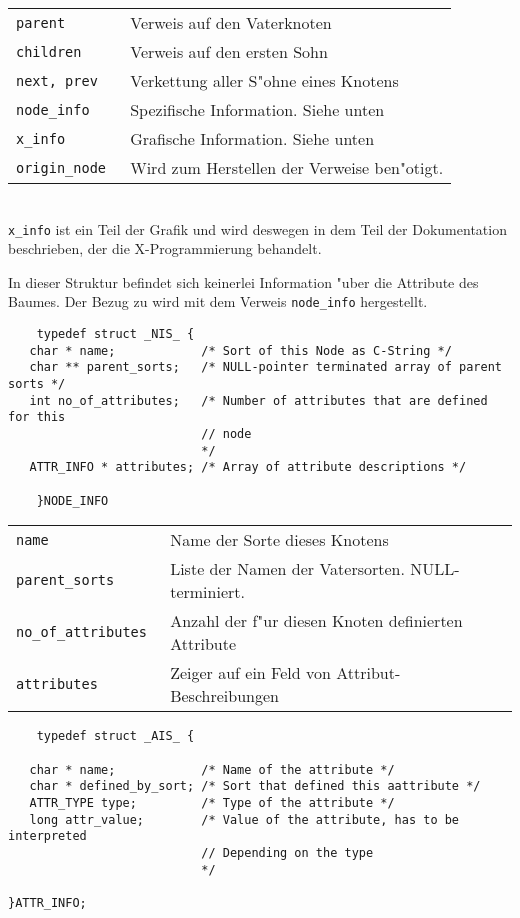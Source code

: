 	\begin{tabular}{ll}
	\tt parent & Verweis auf den Vaterknoten\\
	\tt children & Verweis auf den ersten Sohn\\
	\tt next, prev & Verkettung aller S"ohne eines Knotens\\
	\tt node\_info & Spezifische Information. Siehe unten\\
	\tt x\_info & Grafische Information. Siehe unten\\
	\tt origin\_node & Wird zum Herstellen der Verweise ben"otigt.\\
	\end{tabular}\\

	{\tt x\_info} ist ein Teil der Grafik und wird deswegen in dem Teil der Dokumentation
	beschrieben, der die X-Programmierung behandelt.

	In dieser Struktur befindet sich keinerlei Information "uber die Attribute des Baumes.
	Der Bezug zu \MAX wird mit dem Verweis {\tt node\_info} hergestellt.

	\begin{verbatim}
	typedef struct _NIS_ {
   char * name;            /* Sort of this Node as C-String */
   char ** parent_sorts;   /* NULL-pointer terminated array of parent sorts */
   int no_of_attributes;   /* Number of attributes that are defined for this 
                           // node
                           */
   ATTR_INFO * attributes; /* Array of attribute descriptions */
	 
	}NODE_INFO
	\end{verbatim}
	\begin{tabular}{ll}
	\tt name & Name der Sorte dieses Knotens\\
	\tt parent\_sorts & Liste der Namen der Vatersorten. NULL-terminiert.\\
	\tt no\_of\_attributes & Anzahl der f"ur diesen Knoten definierten Attribute\\
   	\tt attributes & Zeiger auf ein Feld von Attribut-Beschreibungen\\
	\end{tabular}

	\begin{verbatim}
	typedef struct _AIS_ {

   char * name;            /* Name of the attribute */
   char * defined_by_sort; /* Sort that defined this aattribute */
   ATTR_TYPE type;         /* Type of the attribute */
   long attr_value;        /* Value of the attribute, has to be interpreted 
                           // Depending on the type
                           */
   
}ATTR_INFO;
	\end{verbatim}

